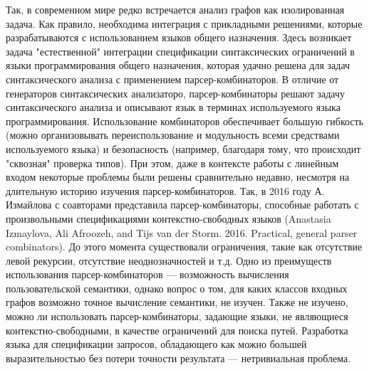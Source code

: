 \documentclass[12pt]{article}  %
\theoremstyle{remark}
\begin{document}
Так, в современном мире редко встречается анализ графов как изолированная задача.
Как правило, необходима интеграция с прикладными решениями, которые разрабатываются с использованием языков общего назначения.
Здесь возникает задача "естественной" интеграции спецификации синтаксических ограничений в языки программирования общего назначения, которая удачно решена для задач синтаксического анализа с применением парсер-комбинаторов.
В отличие от генераторов синтаксических анализаторо, парсер-комбинаторы решают задачу синтаксического анализа и описывают язык в терминах используемого языка программирования.
Использование комбинаторов обеспечивает большую гибкость (можно организовывать переиспользование и модульность всеми средствами используемого языка) и безопасность (например, благодаря тому, что происходит "сквозная" проверка типов).
При этом, даже в контексте работы с линейным входом некоторые проблемы были решены сравнительно недавно, несмотря на длительную историю изучения парсер-комбинаторов.
Так, в 2016 году А. Измайлова с соавторами представила парсер-комбинаторы, способные работать с произвольными спецификациями контекстно-свободных языков (Anastasia Izmaylova, Ali Afroozeh, and Tijs van der Storm. 2016. Practical, general parser combinators).
До этого момента существовали ограничения, такие как отсутствие левой рекурсии, отсутствие неоднозначностей и т.д.
Одно из преимуществ использования парсер-комбинаторов --- возможность вычисления пользовательской семантики, однако вопрос о том, для каких классов входных графов возможно точное вычисление семантики, не изучен.
Также не изучено, можно ли использовать парсер-комбинаторы, задающие языки, не являющиеся контекстно-свободными, в качестве ограничений для поиска путей.
Разработка языка для спецификации запросов, обладающего как можно большей выразительностью без потери точности результата --- нетривиальная проблема.
\end{document}
